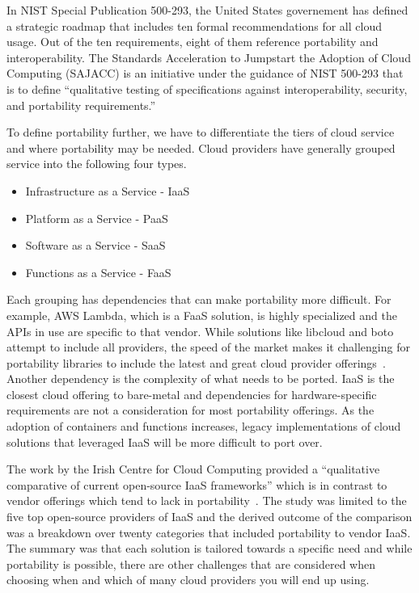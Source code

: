 In NIST Special Publication 500-293, the United States governement has defined
a
strategic roadmap that includes ten formal recommendations for all cloud usage.
Out of the ten requirements, eight of them reference portability and
interoperability. The Standards Acceleration to Jumpstart the Adoption of Cloud
Computing (SAJACC) is an initiative under the guidance of NIST 500-293 that is
to define ``qualitative testing of specifications against interoperability,
security, and portability requirements.''~\cite{hid-sp18-518-NIST-293}

To define portability further, we have to differentiate the tiers of cloud
service and where portability may be needed. Cloud providers have generally
grouped service into the following four types.

\begin{itemize}
\item
  Infrastructure as a Service - IaaS
\item
  Platform as a Service - PaaS
\item
  Software as a Service - SaaS
\item
  Functions as a Service - FaaS
\end{itemize}

Each grouping has dependencies that can make portability more difficult. For
example, AWS Lambda, which is a FaaS solution, is highly specialized and the
APIs in use are specific to that vendor. While solutions like libcloud and boto
attempt to include all providers, the speed of the market makes it challenging
for portability libraries to include the latest and great cloud provider
offerings~\cite{hid-sp18-518-LibCloud}. Another dependency is the complexity of
what needs to be ported. IaaS is the closest cloud offering to bare-metal and
dependencies for hardware-specific requirements are not a consideration for
most
portability offerings. As the adoption of containers and functions increases,
legacy implementations of cloud solutions that leveraged IaaS will be more
difficult to port over. 

The work by the Irish Centre for Cloud Computing provided a ``qualitative
comparative of current  open-source  IaaS frameworks'' which is in contrast to
vendor offerings which tend to lack in
portability~\cite{hid-sp18-518-Comp-study}. The study was limited to the five
top open-source providers of IaaS and the derived outcome of the comparison was
a breakdown over twenty categories that included portability to vendor IaaS.
The
summary was that each solution is tailored towards a specific need and while
portability is possible, there are other challenges that are considered when
choosing when and which of many cloud providers you will end up using.

